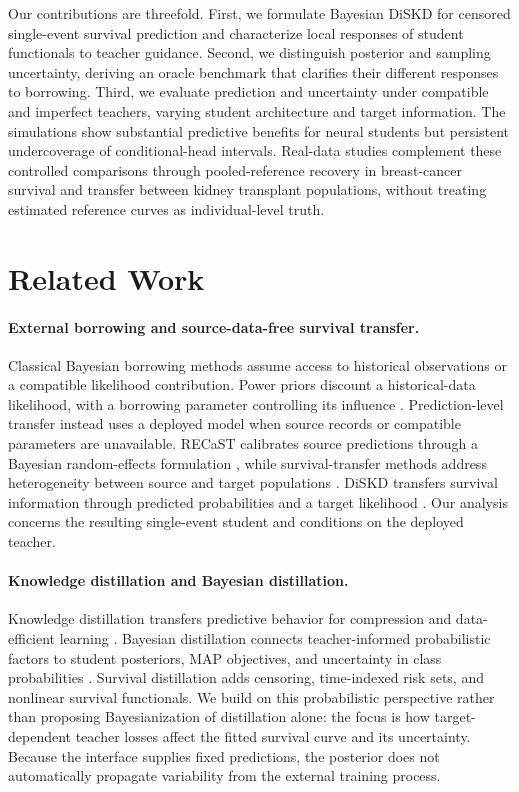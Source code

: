 \documentclass{article} %
\begin{document}
Our contributions are threefold. First, we formulate Bayesian DiSKD for censored single-event survival prediction and characterize local responses of student functionals to teacher guidance. Second, we distinguish posterior and sampling uncertainty, deriving an oracle benchmark that clarifies their different responses to borrowing. Third, we evaluate prediction and uncertainty under compatible and imperfect teachers, varying student architecture and target information. The simulations show substantial predictive benefits for neural students but persistent undercoverage of conditional-head intervals. Real-data studies complement these controlled comparisons through pooled-reference recovery in breast-cancer survival and transfer between kidney transplant populations, without treating estimated reference curves as individual-level truth.

\section{Related Work}
\paragraph{External borrowing and source-data-free survival transfer.}
Classical Bayesian borrowing methods assume access to historical observations or a compatible likelihood contribution. Power priors discount a historical-data likelihood, with a borrowing parameter controlling its influence \citep{chen2000powerprior,ibrahim2003optimality,ibrahim2015powerprior}. Prediction-level transfer instead uses a deployed model when source records or compatible parameters are unavailable. RECaST calibrates source predictions through a Bayesian random-effects formulation \citep{hickey2024recast}, while survival-transfer methods address heterogeneity between source and target populations \citep{lu2026adaptive}. DiSKD transfers survival information through predicted probabilities and a target likelihood \citep{deng2026diskd}. Our analysis concerns the resulting single-event student and conditions on the deployed teacher.

\paragraph{Knowledge distillation and Bayesian distillation.}
Knowledge distillation transfers predictive behavior for compression and data-efficient learning \citep{hinton2015distilling,gou2021survey}. Bayesian distillation connects teacher-informed probabilistic factors to student posteriors, MAP objectives, and uncertainty in class probabilities \citep{fang2024bkd}. Survival distillation adds censoring, time-indexed risk sets, and nonlinear survival functionals. We build on this probabilistic perspective rather than proposing Bayesianization of distillation alone: the focus is how target-dependent teacher losses affect the fitted survival curve and its uncertainty. Because the interface supplies fixed predictions, the posterior does not automatically propagate variability from the external training process.
\end{document}
